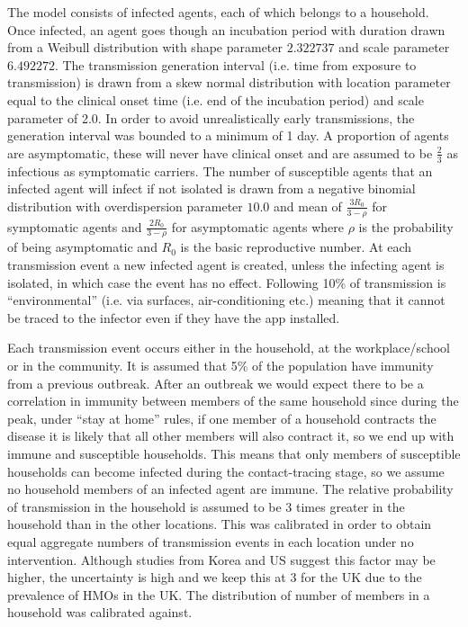 \documentclass{article}
\begin{document}
The model consists of infected agents, each of which belongs to a household. Once infected, an agent goes though an incubation period with duration drawn from a Weibull distribution with shape parameter $2.322737$ and scale parameter $6.492272$\cite{backer2020incubation}. The transmission generation interval (i.e. time from exposure to transmission) is drawn from a skew normal distribution with location parameter equal to the clinical onset time (i.e. end of the incubation period) and scale parameter of 2.0. In order to avoid unrealistically early transmissions, the generation interval was bounded to a minimum of 1 day. A proportion of agents are asymptomatic, these will never have clinical onset and are assumed to be $\frac{2}{3}$ as infectious as symptomatic carriers\cite{ferguson2020impact}. The number of susceptible agents that an infected agent will infect if not isolated is drawn from a negative binomial distribution with overdispersion parameter $10.0$\cite{zhuang2020preliminary}\cite{riou2020pattern} and mean of $\frac{3R_0}{3 - \rho}$ for symptomatic agents and $\frac{2R_0}{3 - \rho}$ for asymptomatic agents where $\rho$ is the probability of being asymptomatic and $R_0$ is the basic reproductive number. At each transmission event a new infected agent is created, unless the infecting agent is isolated, in which case the event has no effect. Following\cite{Ferrettieabb6936} 10\% of transmission is ``environmental'' (i.e. via surfaces, air-conditioning etc.) meaning that it cannot be traced to the infector even if they have the app installed.

Each transmission event occurs either in the household, at the workplace/school or in the community. It is assumed that 5\% of the population have immunity from a previous outbreak. After an outbreak we would expect there to be a correlation in immunity between members of the same household since during the peak, under ``stay at home'' rules, if one member of a household contracts the disease it is likely that all other members will also contract it, so we end up with immune and susceptible households. This means that only members of susceptible households can become infected during the contact-tracing stage, so we assume no household members of an infected agent are immune. The relative probability of transmission in the household is assumed to be 3 times greater in the household than in the other locations. This was calibrated in order to obtain equal aggregate numbers of transmission events in each location under no intervention\cite{ferguson2020impact}. Although studies from Korea and US suggest this factor may be higher\cite{OsongReport}\cite{burke2020active}, the uncertainty is high and we keep this at 3 for the UK due to the prevalence of HMOs in the UK. The distribution of number of members in a household was calibrated against\cite{smithHouseholds}.
\end{document}

